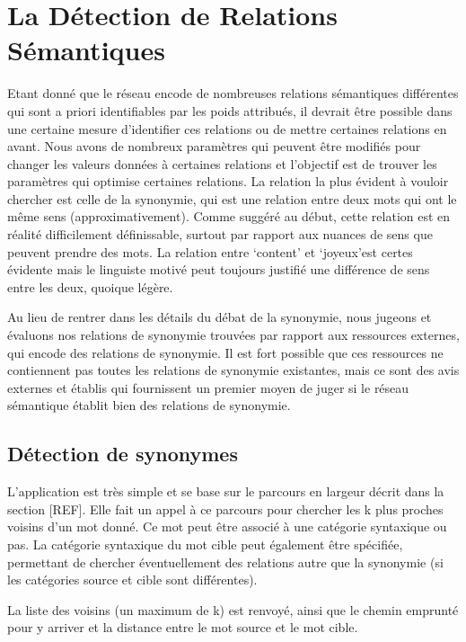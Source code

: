 \section{La Détection de Relations Sémantiques}

Etant donné que le réseau encode de nombreuses relations sémantiques différentes qui sont a priori identifiables par les poids attribués, il devrait être possible dans une certaine mesure d'identifier ces relations ou de mettre certaines relations en avant. Nous avons de nombreux paramètres qui peuvent être modifiés pour changer les valeurs données à certaines relations et l'objectif est de trouver les paramètres qui optimise certaines relations. La relation la plus évident à vouloir chercher est celle de la synonymie, qui est une relation entre deux mots qui ont le même sens (approximativement). Comme suggéré au début, cette relation est en réalité difficilement définissable, surtout par rapport aux nuances de sens que peuvent prendre des mots. La relation entre \lq{content}\rq{} et \lq{joyeux}\rq est certes évidente mais le linguiste motivé peut toujours justifié une différence de sens entre les deux, quoique légère.

Au lieu de rentrer dans les détails du débat de la synonymie, nous jugeons et évaluons nos relations de synonymie trouvées par rapport aux ressources externes, qui encode des relations de synonymie. Il est fort possible que ces ressources ne contiennent pas toutes les relations de synonymie existantes, mais ce sont des avis externes et établis qui fournissent un premier moyen de juger si le réseau sémantique établit bien des relations de synonymie.

\subsection{Détection de synonymes}

L'application est très simple et se base sur le parcours en largeur décrit dans la section [REF]. Elle fait un appel à ce parcours pour chercher les k plus proches voisins d'un mot donné. Ce mot peut être associé à une catégorie syntaxique ou pas. La catégorie syntaxique du mot cible peut également être spécifiée, permettant de chercher éventuellement des relations autre que la synonymie (si les catégories source et cible sont différentes).

La liste des voisins (un maximum de k) est renvoyé, ainsi que le chemin emprunté pour y arriver et la distance entre le mot source et le mot cible.

